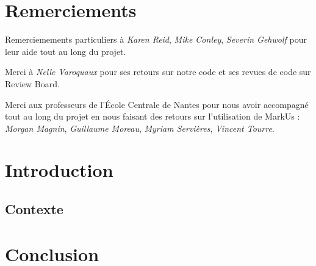 \documentclass[a4paper,11pt]{article}
\begin{document}
\newpage
\tableofcontents

\newpage

\setcounter{page}{1}
\fancyfoot[C]{\thepage}
\section*{Remerciements}
Remerciemements particuliers à \emph{Karen Reid}, \emph{Mike Conley},
\emph{Severin Gehwolf} pour leur aide tout au long du projet.

Merci à \emph{Nelle Varoquaux} pour ses retours sur notre code et ses revues
de code sur Review Board.

Merci aux professeurs de l'École Centrale de Nantes pour nous avoir accompagné
tout au long du projet en nous faisant des retours sur l'utilisation de MarkUs
:  \emph{Morgan Magnin}, \emph{Guillaume Moreau}, \emph{Myriam Servières},
\emph{Vincent Tourre}.

\newpage

\fancyfoot[C]{\thepage}
\section*{Introduction}

\subsection*{Contexte}



\newpage
{}
\section*{Conclusion}



\newpage
{}
\listoffigures

\newpage
{}
\fancyfoot[C]{\thepage}
\end{document}
